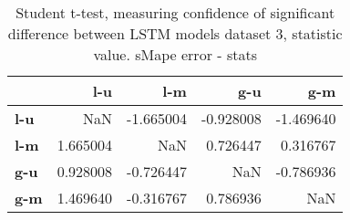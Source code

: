 \begin{table}[h]
\centering
\caption{Student t-test, measuring confidence of significant difference between LSTM models dataset 3, statistic value. sMape error - stats}
\label{table:ttest-stats-lstm-experiments-sMAPE-dataset-3}
\begin{tabular}{lrrrr}
\toprule
{} &       l-u &       l-m &       g-u &       g-m \\
\midrule
\textbf{l-u} &       NaN & -1.665004 & -0.928008 & -1.469640 \\
\textbf{l-m} &  1.665004 &       NaN &  0.726447 &  0.316767 \\
\textbf{g-u} &  0.928008 & -0.726447 &       NaN & -0.786936 \\
\textbf{g-m} &  1.469640 & -0.316767 &  0.786936 &       NaN \\
\bottomrule
\end{tabular}
\end{table}
